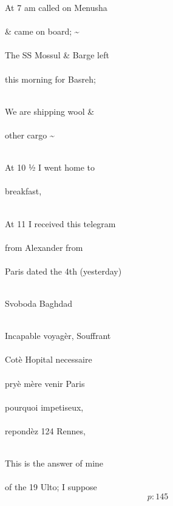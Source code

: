\documentclass{report}
\begin{document}
	\par{
 	At 7 am called on Menusha\ \\\ \\\& came on board; \~{}\ \\\ \\The SS Mossul \& Barge left\ \\\ \\this morning for Basreh;\ \\\ \\
	}

	\par{
 	We are shipping wool \&\ \\\ \\other cargo \~{}\ \\\ \\
	}

	\par{
 	At 10 ½ I went home to\ \\\ \\breakfast,\ \\\ \\
	}

	\par{
 	At 11 I received this telegram\ \\\ \\from Alexander from\ \\\ \\Paris dated the 4th (yesterday)\ \\\ \\
	}

	\par{
 	Svoboda Baghdad\ \\\ \\
	}

	\par{
 	Incapable voyagèr, Souffrant\ \\\ \\Cotè Hopital necessaire\ \\\ \\pryè mère venir Paris\ \\\ \\pourquoi impetiseux,\ \\\ \\repondèz 124 Rennes,\ \\\ \\
	}

	\par{
 	This is the answer of mine\ \\\ \\of the 19 Ulto; I suppose\ \\
  \[p: 145 \]

	}
\end{document}
